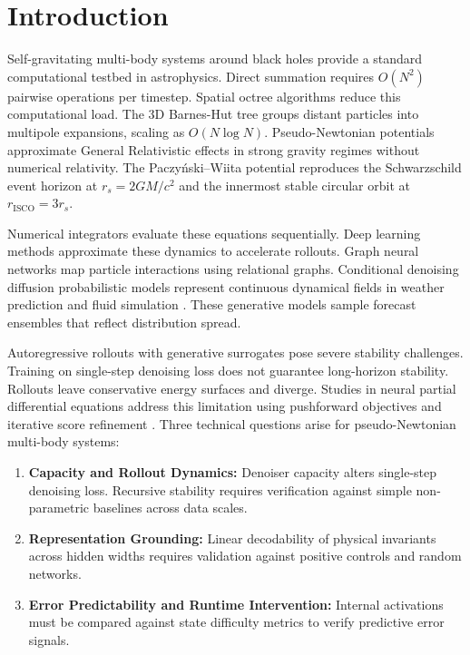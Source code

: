 \documentclass[11pt,a4paper]{article}
\begin{document}
\section{Introduction}

Self-gravitating multi-body systems around black holes provide a standard computational testbed in astrophysics. Direct summation requires $O(N^2)$ pairwise operations per timestep. Spatial octree algorithms reduce this computational load. The 3D Barnes-Hut tree \cite{Barnes1986} groups distant particles into multipole expansions, scaling as $O(N \log N)$. Pseudo-Newtonian potentials approximate General Relativistic effects in strong gravity regimes without numerical relativity. The Paczy\'nski--Wiita potential \cite{Paczynski1980} reproduces the Schwarzschild event horizon at $r_s = 2GM/c^2$ and the innermost stable circular orbit at $r_{\mathrm{ISCO}} = 3r_s$.

Numerical integrators evaluate these equations sequentially. Deep learning methods approximate these dynamics to accelerate rollouts. Graph neural networks \cite{sanchez-gonzalez2020learning, battaglia2016interaction} map particle interactions using relational graphs. Conditional denoising diffusion probabilistic models \cite{ho2020denoising, song2021scorebased} represent continuous dynamical fields in weather prediction and fluid simulation \cite{finn2024representation, li2024generative, bastek2024physics}. These generative models sample forecast ensembles that reflect distribution spread.

Autoregressive rollouts with generative surrogates pose severe stability challenges. Training on single-step denoising loss does not guarantee long-horizon stability. Rollouts leave conservative energy surfaces and diverge. Studies in neural partial differential equations address this limitation using pushforward objectives \cite{brandstetter2022message} and iterative score refinement \cite{LippeVPTB23}. Three technical questions arise for pseudo-Newtonian multi-body systems:
\begin{enumerate}
    \item \textbf{Capacity and Rollout Dynamics:} Denoiser capacity alters single-step denoising loss. Recursive stability requires verification against simple non-parametric baselines across data scales.
    \item \textbf{Representation Grounding:} Linear decodability of physical invariants across hidden widths requires validation against positive controls and random networks.
    \item \textbf{Error Predictability and Runtime Intervention:} Internal activations must be compared against state difficulty metrics to verify predictive error signals.
\end{enumerate}
\end{document}
